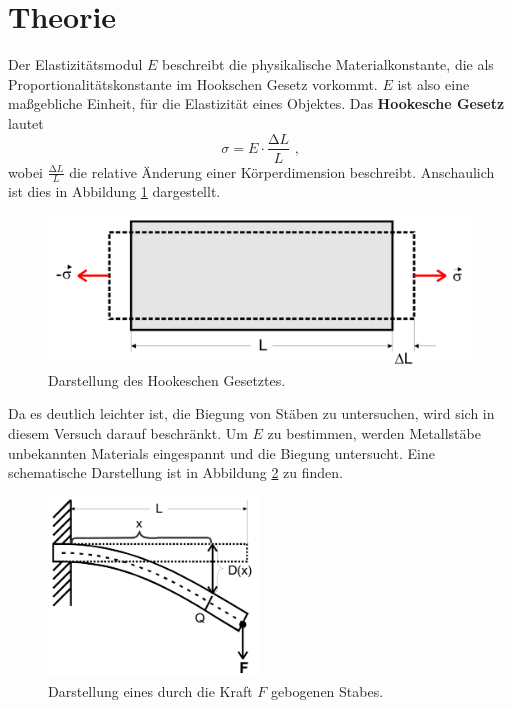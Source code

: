 \section{Theorie}
\label{sec:Theorie}

Der Elastizitätsmodul $E$ beschreibt die physikalische Materialkonstante,
die als Proportionalitätskonstante im Hookschen Gesetz vorkommt.
$E$ ist also eine maßgebliche Einheit, für die Elastizität eines Objektes.
Das \textbf{Hookesche Gesetz} lautet
\begin{equation}
        \sigma = E \cdot \frac {\increment L}{L} \text{ ,}
\end{equation}
wobei $\frac {\increment L}{L}$ die relative Änderung einer Körperdimension beschreibt.
Anschaulich ist dies in Abbildung \ref{fig:Hook1} dargestellt.

\begin{figure}[H]
        \centering
        \includegraphics[width=\textwidth]{pictures/Hook1.png}
        \caption{Darstellung des Hookeschen Gesetztes.}
        \label{fig:Hook1}
\end{figure}

Da es deutlich leichter ist, die Biegung von Stäben zu untersuchen, wird sich in diesem Versuch darauf beschränkt.
Um $E$ zu bestimmen, werden Metallstäbe unbekannten Materials eingespannt und die Biegung untersucht.
Eine schematische Darstellung ist in Abbildung \ref{fig:Hook2} zu finden.

\begin{figure}[H]
        \centering
        \includegraphics[width=0.5\textwidth]{pictures/Hook2.png}
        \caption{Darstellung eines durch die Kraft $F$ gebogenen Stabes.}
        \label{fig:Hook2}
\end{figure}


